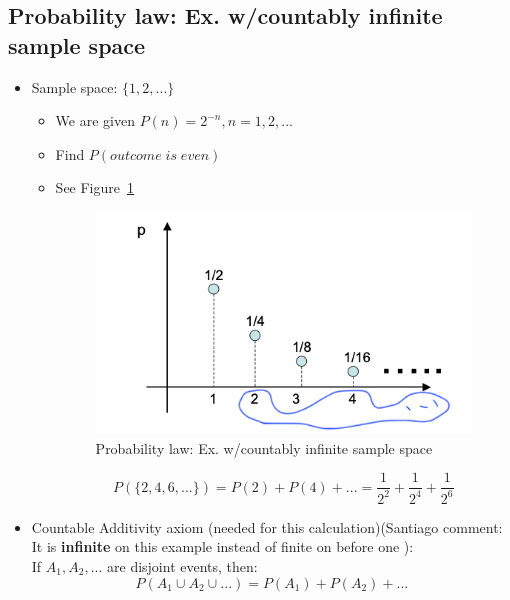 \subsection{Probability law: Ex. w/countably infinite sample space}
    \begin{itemize}
        \item Sample space: $\{1,2,...\}$
        \begin{itemize}
            \item We are given $P(n) = 2^{-n}, n=1,2,...$
            \item Find $P(outcome \; is \; even)$
            \item See Figure~\ref{fig:1-10}
            \begin{figure}[h!]
                \centering
                \includegraphics[scale=0.7]{images/1-10}
                \caption{Probability law: Ex. w/countably infinite sample space}
                \label{fig:1-10}
            \end{figure}
            $$
            P(\{2,4,6,...\}) = P(2) + P(4) + ... = \frac{1}{2^2} + \frac{1}{2^4} + \frac{1}{2^6}
            $$
        \end{itemize}

        \item Countable Additivity axiom (needed for this calculation)(Santiago comment: It is \textbf{infinite} on this example instead of finite on before one ): \\
        If $A_1, A_2, ...$ are disjoint events, then:
        $$
        P(A_1 \cup A_2 \cup ...) = P(A_1) + P(A_2) + ...
        $$
        
    \end{itemize}


